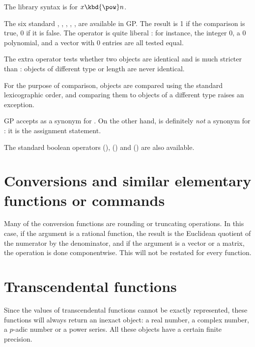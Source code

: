 The library syntax is 
for $x\hbox{\kbd{\pow}}n$.


 The six
standard  \kbd{<=}, \kbd{<}, \kbd{>=}, \kbd{>},
\kbd{==}, \kbd{!=} are available in GP. The result is 1 if the comparison is
true, 0 if it is false. The operator \kbd{==} is quite liberal : for
instance, the integer 0, a 0 polynomial, and a vector with 0 entries are all
tested equal.

The extra operator \kbd{===} tests whether two objects are identical and is
much stricter than \kbd{==} : objects of different type or length are never
identical.

For the purpose of comparison,  objects are compared using
the standard lexicographic order, and comparing them to objects
of a different type raises an exception.

GP accepts \kbd{<>} as a synonym for \kbd{!=}. On the other hand, \kbd{=} is
definitely \emph{not} a synonym for \kbd{==}: it is the assignment statement.

The standard boolean operators \kbd{||} (), \kbd{\&\&}
() and \kbd{!} () are also available.

\section{Conversions and similar elementary functions or commands}
\label{se:conversion}

\noindent
Many of the conversion functions are rounding or truncating operations. In
this case, if the argument is a rational function, the result is the
Euclidean quotient of the numerator by the denominator, and if the argument
is a vector or a matrix, the operation is done componentwise. This will not
be restated for every function.


\section{Transcendental functions}\label{se:trans}

Since the values of transcendental functions cannot be exactly represented,
these functions will always return an inexact object: a real number,
a complex number, a $p$-adic number or a power series.  All these objects
have a certain finite precision.

